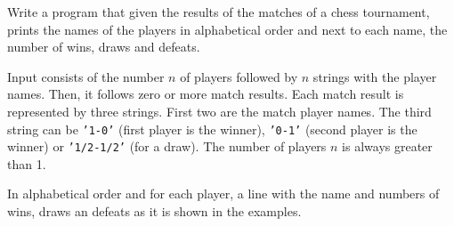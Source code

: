 

\UsePython

\Statement
Write a program that given the results of the matches of a chess tournament, 
prints the names of the players in alphabetical order and next to each name, 
the number of wins, draws and defeats.

\Input

Input consists of the number $n$ of players followed by $n$ strings 
with the player names. Then, it follows zero or more match results. Each match
result is represented by three strings. First two are the match player names. The third string 
can be {\tt '1-0'} (first player is the winner), {\tt '0-1'} (second player is the winner) or
{\tt '1/2-1/2'} (for a draw). The number of players $n$ is always greater than 1.


\Output

In alphabetical order and for each player, a line with the name and numbers 
of wins, draws an defeats 
as it is shown in the examples. 




\SampleTwoCol
